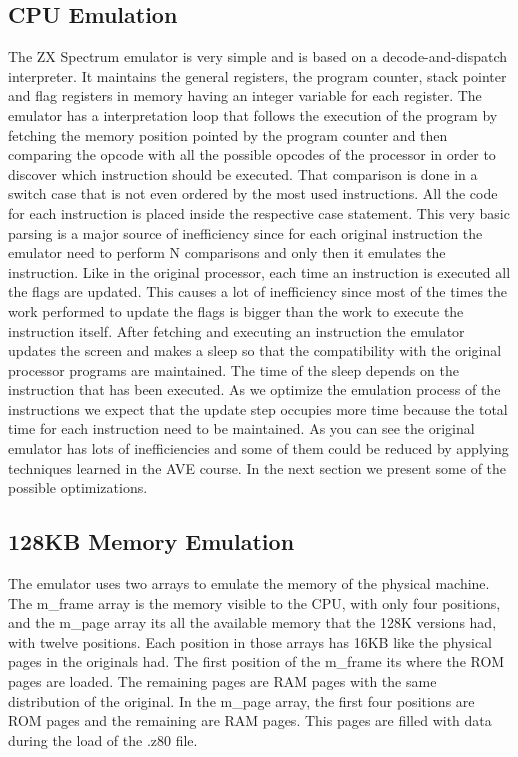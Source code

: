 \subsection{CPU Emulation}
The ZX Spectrum emulator is very simple and is based on a decode-and-dispatch interpreter. It maintains the general registers, the program counter, stack pointer and flag registers in memory having an integer variable for each register.
The emulator has a interpretation loop that follows the execution of the program by fetching the memory position pointed by the program counter and then comparing the opcode with all the possible opcodes of the processor in order to discover which instruction should be executed. That comparison is done in a switch case that is not even ordered by the most used instructions. 
All the code for each instruction is placed inside the respective case statement. This very basic parsing is a major source of inefficiency since for each original instruction the emulator need to perform N comparisons and only then it emulates the instruction. 
Like in the original processor, each time an instruction is executed all the flags are updated. This causes a lot of inefficiency since most of the times the work performed to update the flags is bigger than the work to execute the instruction itself.
After fetching and executing an instruction the emulator updates the screen and makes a sleep so that the compatibility with the original processor programs are maintained. The time of the sleep depends on the instruction that has been executed. As we optimize the emulation process of the instructions we expect that the update step occupies more time because the total time for each instruction need to be maintained.
As you can see the original emulator has lots of inefficiencies and some of them could be reduced by applying techniques learned in the AVE course. In the next section we present some of the possible optimizations.

\subsection{128KB Memory Emulation}
The emulator uses two arrays to emulate the memory of the physical machine. The m\_frame array is the memory visible to the CPU, with only four positions, and the m\_page array its all the available memory that the 128K versions had, with twelve positions. Each position in those arrays has 16KB like the physical pages in the originals had.
The first position of the m\_frame its where the ROM pages are loaded. The remaining pages are RAM pages with the same distribution of the original. In the m\_page array, the first four positions are ROM pages and the remaining are RAM pages. This pages are filled with data during the load of the .z80 file.

